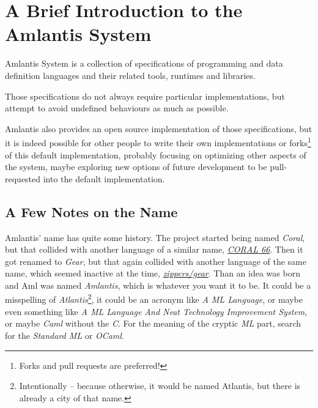 
\chapter*{A Brief Introduction to the Amlantis System}
\label{sec:brief-intro}

Amlantis System is a collection of specifications of programming and data definition languages and their related tools, runtimes and libraries. 

Those specifications do not always require particular implementations, but attempt to avoid undefined behaviours as much as possible. 

Amlantis also provides an open source implementation of those specifications, but it is indeed possible for other people to write their own implementations or forks\footnote{Forks and pull requests are preferred!} of this default implementation, probably focusing on optimizing other aspects of the system, maybe exploring new options of future development to be pull-requested into the default implementation. 





\section*{A Few Notes on the Name}

Amlantis' name has quite some history. The project started being named {\em Coral}, but that collided with another language of a similar name, \href{https://en.wikipedia.org/wiki/Coral_66}{{\em CORAL 66}}. Then it got renamed to {\em Gear}, but that again collided with another language of the same name, which seemed inactive at the time, \href{https://github.com/zippers/gear}{{\em zippers/gear}}. Than an idea was born and Aml was named {\em Amlantis}, which is whatever you want it to be. It could be a misspelling of {\em Atlantis}\footnote{Intentionally -- because otherwise, it would be named Atlantis, but there is already a city of that name.}, it could be an acronym like {\em A ML Language}, or maybe even something like {\em A ML Language And Neat Technology Improvement System}, or maybe {\em Caml} without the {\em C}. For the meaning of the cryptic {\em ML} part, search for the {\em Standard ML} or {\em OCaml}. 





\newpage

